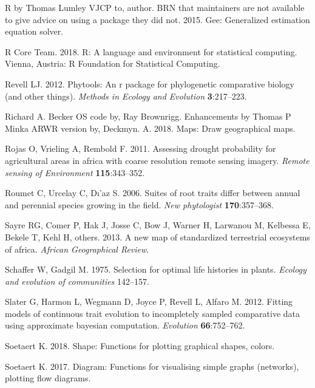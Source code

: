 \documentclass[man,floatsintext]{apa6}
\theoremstyle{definition}
\theoremstyle{definition}
\theoremstyle{definition}
\theoremstyle{remark}
\begin{document}
\leavevmode\hypertarget{ref-R-gee}{}%
R by Thomas Lumley VJCP to, author. BRN that maintainers are not
available to give advice on using a package they did not. 2015. Gee:
Generalized estimation equation solver.

\leavevmode\hypertarget{ref-R-base}{}%
R Core Team. 2018. R: A language and environment for statistical
computing. Vienna, Austria: R Foundation for Statistical Computing.

\leavevmode\hypertarget{ref-R-phytools}{}%
Revell LJ. 2012. Phytools: An r package for phylogenetic comparative
biology (and other things). \emph{Methods in Ecology and Evolution}
\textbf{3}:217--223.

\leavevmode\hypertarget{ref-R-maps}{}%
Richard A. Becker OS code by, Ray Brownrigg. Enhancements by Thomas P
Minka ARWR version by, Deckmyn. A. 2018. Maps: Draw geographical maps.

\leavevmode\hypertarget{ref-rojas2011assessing}{}%
Rojas O, Vrieling A, Rembold F. 2011. Assessing drought probability for
agricultural areas in africa with coarse resolution remote sensing
imagery. \emph{Remote sensing of Environment} \textbf{115}:343--352.

\leavevmode\hypertarget{ref-roumet2006suites}{}%
Roumet C, Urcelay C, Dı'az S. 2006. Suites of root traits differ between
annual and perennial species growing in the field. \emph{New
phytologist} \textbf{170}:357--368.

\leavevmode\hypertarget{ref-sayre2013new}{}%
Sayre RG, Comer P, Hak J, Josse C, Bow J, Warner H, Larwanou M, Kelbessa
E, Bekele T, Kehl H, others. 2013. A new map of standardized terrestrial
ecosystems of africa. \emph{African Geographical Review}.

\leavevmode\hypertarget{ref-schaffer1975selection}{}%
Schaffer W, Gadgil M. 1975. Selection for optimal life histories in
plants. \emph{Ecology and evolution of communities} 142--157.

\leavevmode\hypertarget{ref-R-geiger_c}{}%
Slater G, Harmon L, Wegmann D, Joyce P, Revell L, Alfaro M. 2012.
Fitting models of continuous trait evolution to incompletely sampled
comparative data using approximate bayesian computation.
\emph{Evolution} \textbf{66}:752--762.

\leavevmode\hypertarget{ref-R-shape}{}%
Soetaert K. 2018. Shape: Functions for plotting graphical shapes,
colors.

\leavevmode\hypertarget{ref-R-diagram}{}%
Soetaert K. 2017. Diagram: Functions for visualising simple graphs
(networks), plotting flow diagrams.
\end{document}
